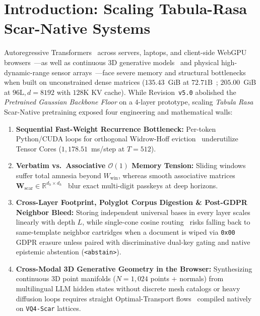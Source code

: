 \documentclass[10pt,twocolumn]{article}
\begin{document}
\begin{abstract}
(4) \textbf{\texttt{PointScarFlow v1.0}}: a $3.87$~MiB Tabula-Rasa \texttt{ScarNativeLinear} 3D Optimal-Transport Rectified Flow generator ($12$ WGSL shaders, $4$ Euler steps) conditioned on \texttt{Qwen2.5-3B} Layer-$23$ $P_{\perp\text{lang}}$ reduces held-out Chamfer-$L_2$ by $\mathbf{7.51\times}$ ($0.0621$ vs.\ $0.4663$ sphere) with $0.9974$--$0.9978$ cross-lingual 3D shape cosine across \texttt{PT/EN/ES/FR}.
\end{abstract}

\section{Introduction: Scaling Tabula-Rasa Scar-Native Systems}
Autoregressive Transformers~\citep{vaswani2017attention} across servers, laptops, and client-side WebGPU browsers~\citep{w3c2024webgpu}---as well as continuous 3D generative models~\citep{lipman2023flow,liu2023flow} and physical high-dynamic-range sensor arrays~\citep{leshem2000multichannel}---face severe memory and structural bottlenecks when built on unconstrained dense matrices ($135.43$~GiB at $72.71\text{B}$~\citep{dettmers2022llmint8,lin2024awq}; $205.00$~GiB at $96\text{L}, d=8192$ with $128\text{K}$ KV cache). While Revision~\texttt{v5.0} abolished the \emph{Pretrained Gaussian Backbone Floor} on a $4$-layer prototype, scaling \emph{Tabula Rasa} Scar-Native pretraining exposed four engineering and mathematical walls:
\begin{enumerate}
    \item \textbf{Sequential Fast-Weight Recurrence Bottleneck:} Per-token Python/CUDA loops for orthogonal Widrow-Hoff eviction~\citep{widrow1960adaptive,schmidhuber1992learning,schlag2021linear} underutilize Tensor Cores ($1{,}178.51$~ms/step at $T=512$).
    \item \textbf{Verbatim vs.\ Associative $\mathcal{O}(1)$ Memory Tension:} Sliding windows~\citep{xiao2024efficient,zhang2023h2o} suffer total amnesia beyond $W_{\text{win}}$, whereas smooth associative matrices $\mathbf{W}_{\text{scar}} \in \mathbb{R}^{d_h \times d_h}$~\citep{yang2024parallelizing} blur exact multi-digit passkeys at deep horizons.
    \item \textbf{Cross-Layer Footprint, Polyglot Corpus Digestion \& Post-GDPR Neighbor Bleed:} Storing independent universal bases in every layer scales linearly with depth $L$, while single-cone cosine routing~\citep{meng2022locating,fang2025alphaedit,dettmers2023qlora} risks falling back to same-template neighbor cartridges when a document is wiped via \texttt{0x00} GDPR erasure unless paired with discriminative dual-key gating and native epistemic abstention (\texttt{<abstain>}).
    \item \textbf{Cross-Modal 3D Generative Geometry in the Browser:} Synthesizing continuous 3D point manifolds ($N=1{,}024$ points + normals) from multilingual LLM hidden states without discrete mesh catalogs or heavy diffusion loops requires straight Optimal-Transport flows~\citep{lipman2023flow,liu2023flow} compiled natively on \texttt{VQ4-Scar} lattices.
\end{enumerate}
\end{document}
